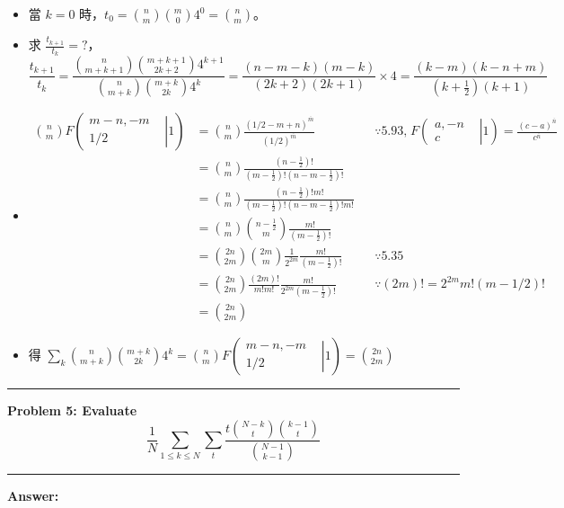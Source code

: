 \documentclass[11pt]{article}
\newcommand\question[2]{\vspace{.25in}\hrule\textbf{#1: #2}\vspace{.5em}\hrule\vspace{.10in}}
\renewcommand\part[1]{\vspace{.10in}\textbf{#1}}
\begin{document}
\begin{itemize}
	\item 當 $k = 0$ 時，$t_0 = \binom{n}{m} \binom{m}{0} 4^0 = \binom{n}{m}$。
	\item 求 $\frac{t_{k+1}}{t_k} = ?$，
	$$\frac{t_{k+1}}{t_k} = \frac{\binom{n}{m+k+1}\binom{m+k+1}{2k+2} 4^{k+1}}{\binom{n}{m+k}\binom{m+k}{2k} 4^k} = \frac{(n-m-k)(m-k)}{(2k+2)(2k+1)} \times 4 = \frac{(k-m)(k-n+m)}{(k+\frac{1}{2})(k+1)}$$
	\item 
		\begin{align*}
		\binom{n}{m} F \left (\left.\begin{matrix}
m-n, -m & \\ 
 1/2 & 
\end{matrix}\right|1 \right) &= \binom{n}{m} \frac{(1/2-m+n)^{\overline{m}}}{(1/2)^{\overline{m}}} 
			&& \because \text{5.93,} \; F \left (\left.\begin{matrix}
a, -n & \\ 
 c & 
\end{matrix}\right|1 \right) = \frac{(c-a)^{\overline{n}}}{c^{\overline{n}}}\\
			&= \binom{n}{m} \frac{(n-\frac{1}{2})!}{(m-\frac{1}{2})!(n-m-\frac{1}{2})!} \\
			&= \binom{n}{m} \frac{(n-\frac{1}{2})!m!}{(m-\frac{1}{2})!(n-m-\frac{1}{2})!m!} \\
			&= \binom{n}{m} \binom{n-\frac{1}{2}}{m} \frac{m!}{(m-\frac{1}{2})!} \\
			&= \binom{2n}{2m} \binom{2m}{m} \frac{1}{2^{2m}} \frac{m!}{(m-\frac{1}{2})!} 
				&& \because \text{5.35}  \\
			&= \binom{2n}{2m} \frac{(2m)!}{m!m!} \frac{m!}{2^{2m} (m-\frac{1}{2})!} 
				&& \because (2m)! = 2^{2m} m! (m-1/2)!\\
			&= \binom{2n}{2m}
		\end{align*}
	\item
		得 $\sum_k \binom{n}{m+k} \binom{m+k}{2k} 4^k = \binom{n}{m} F \left (\left.\begin{matrix}
m-n, -m & \\ 
 1/2 & 
\end{matrix}\right|1 \right) = \binom{2n}{2m}$
\end{itemize}

\question{Problem 5} {Evaluate $$\frac{1}{N} \sum_{1 \le k \le N} \sum_{t} \frac{t \binom{N-k}{t} \binom{k-1}{t}}{\binom{N-1}{k-1}}$$}

\part{Answer:}
\end{document}
